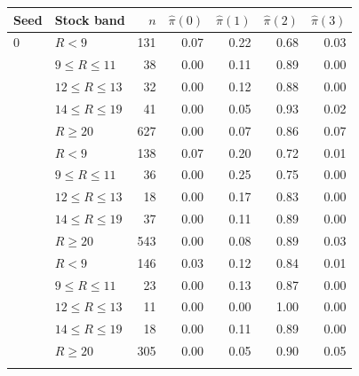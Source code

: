 \begin{tabular}{llrrrrr}
\toprule
Seed & Stock band & $n$ & $\hat\pi(0)$ & $\hat\pi(1)$ & $\hat\pi(2)$ & $\hat\pi(3)$ \\
\midrule
0 & $R<9$ & 131 & 0.07 & 0.22 & 0.68 & 0.03 \\
 & $9\le R\le 11$ & 38 & 0.00 & 0.11 & 0.89 & 0.00 \\
 & $12\le R\le 13$ & 32 & 0.00 & 0.12 & 0.88 & 0.00 \\
 & $14\le R\le 19$ & 41 & 0.00 & 0.05 & 0.93 & 0.02 \\
 & $R\ge 20$ & 627 & 0.00 & 0.07 & 0.86 & 0.07 \\
\addlinespace
1 & $R<9$ & 138 & 0.07 & 0.20 & 0.72 & 0.01 \\
 & $9\le R\le 11$ & 36 & 0.00 & 0.25 & 0.75 & 0.00 \\
 & $12\le R\le 13$ & 18 & 0.00 & 0.17 & 0.83 & 0.00 \\
 & $14\le R\le 19$ & 37 & 0.00 & 0.11 & 0.89 & 0.00 \\
 & $R\ge 20$ & 543 & 0.00 & 0.08 & 0.89 & 0.03 \\
\addlinespace
2 & $R<9$ & 146 & 0.03 & 0.12 & 0.84 & 0.01 \\
 & $9\le R\le 11$ & 23 & 0.00 & 0.13 & 0.87 & 0.00 \\
 & $12\le R\le 13$ & 11 & 0.00 & 0.00 & 1.00 & 0.00 \\
 & $14\le R\le 19$ & 18 & 0.00 & 0.11 & 0.89 & 0.00 \\
 & $R\ge 20$ & 305 & 0.00 & 0.05 & 0.90 & 0.05 \\
\addlinespace
\bottomrule
\end{tabular}
